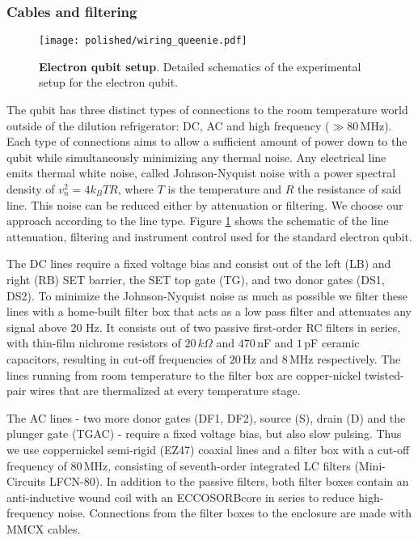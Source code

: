 \subsubsection{Cables and filtering}

\begin{figure}
	\centering
	\texttt{[image: polished/wiring\_queenie.pdf]}
	\caption[Electron qubit setup]{\textbf{Electron qubit setup}. Detailed schematics of the experimental setup for the electron qubit.  }
	\label{fig:queenie_setup}
\end{figure}

The qubit has three distinct types of connections to the room temperature world outside of the dilution refrigerator: DC, AC and high frequency ($\gg80\,$MHz). Each type of connections aims to allow a sufficient amount of power down to the qubit while simultaneously minimizing any thermal noise. Any electrical line emits thermal white noise, called Johnson-Nyquist noise \cite{Johnson1928, Nyquist1928} with a power spectral density of $v_n^2=4k_BTR$, where $T$ is the temperature and $R$ the resistance of said line. This noise can be reduced either by attenuation or filtering. We choose our approach according to the line type. 
Figure \ref{fig:queenie_setup} shows the schematic of the line attenuation,  filtering and instrument control used for the standard electron qubit. 

The DC lines require a fixed voltage bias and consist out of the left (LB) and right (RB) SET barrier, the SET top gate (TG), and two donor gates (DS1, DS2). To minimize the Johnson-Nyquist noise as much as possible we filter these lines with a home-built filter box that acts as a low pass filter and attenuates any signal above 20 Hz. It consists out of two passive first-order RC filters in series, with thin-film nichrome resistors of $20\,k\Omega$ and $470\,$nF and $1\,$pF ceramic capacitors, resulting in cut-off frequencies of $20\,$Hz and $8\,$MHz respectively. The lines running from room temperature to the filter box are copper-nickel twisted-pair wires that are thermalized at every temperature stage. 

The AC lines - two more donor gates (DF1, DF2), source (S), drain (D) and the plunger gate (TGAC) - require a fixed voltage bias, but also slow pulsing. Thus we use coppernickel semi-rigid (EZ47) coaxial lines and a filter box with a cut-off frequency of $80\,$MHz, consisting of seventh-order integrated LC filters (Mini-Circuits LFCN-80). 
In addition to the passive filters, both filter boxes contain an anti-inductive wound coil with an ECCOSORB\textregistered core in series to reduce high-frequency noise.  Connections from the filter boxes to the enclosure are made with MMCX cables. 

